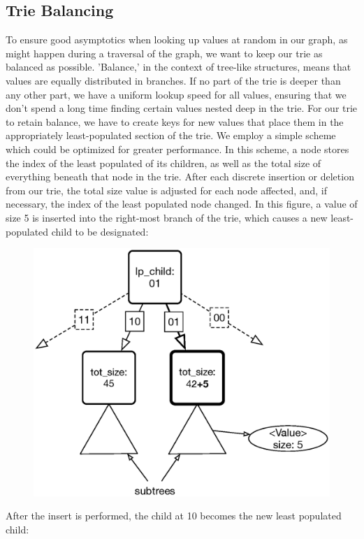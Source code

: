 \documentclass[preprint]{sigplanconf}
\begin{document}
\subsection{Trie Balancing}
To ensure good asymptotics when looking up values at random in our graph, as might happen during a traversal of the graph, we want to keep our trie as balanced as possible.
'Balance,' in the context of tree-like structures, means that values are equally distributed in branches.
If no part of the trie is deeper than any other part, we have a uniform lookup speed for all values, ensuring that we don't spend a long time finding certain values nested deep in the trie.
For our trie to retain balance, we have to create keys for new values that place them in the appropriately least-populated section of the trie.
We employ a simple scheme which could be optimized for greater performance.
In this scheme, a node stores the index of the least populated of its children, as well as the total size of everything beneath that node in the trie.
After each discrete insertion or deletion from our trie, the total size value is adjusted for each node affected, and, if necessary, the index of the least populated node changed.
In this figure, a value of size 5 is inserted into the right-most branch of the trie, which causes a new least-populated child to be designated:
\begin{figure}[H]
\includegraphics[scale=.45]{balancing}
\centering
\end{figure}
After the insert is performed, the child at 10 becomes the new least populated child:
\end{document}
